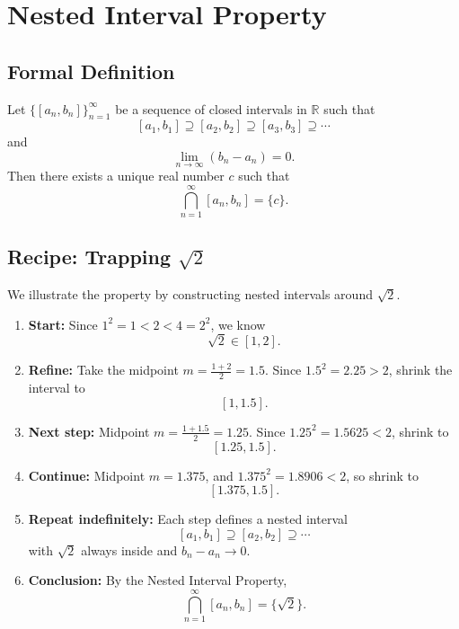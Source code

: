 \documentclass[a4paper,12pt]{article}
\begin{document}
\section*{Nested Interval Property}

\subsection*{Formal Definition}
Let $\{[a_n,b_n]\}_{n=1}^\infty$ be a sequence of closed intervals in $\mathbb{R}$ such that
\[
[a_1,b_1] \supseteq [a_2,b_2] \supseteq [a_3,b_3] \supseteq \cdots
\]
and
\[
\lim_{n \to \infty} (b_n - a_n) = 0.
\]
Then there exists a unique real number $c$ such that
\[
\bigcap_{n=1}^\infty [a_n,b_n] = \{c\}.
\]

\subsection*{Recipe: Trapping $\sqrt{2}$}
We illustrate the property by constructing nested intervals around $\sqrt{2}$.

\begin{enumerate}
	\item \textbf{Start:} Since $1^2 = 1 < 2 < 4 = 2^2$, we know
	$$
	\sqrt{2} \in [1,2].
	$$
	
	\item \textbf{Refine:} Take the midpoint $m = \tfrac{1+2}{2} = 1.5$.  
	Since $1.5^2 = 2.25 > 2$, shrink the interval to
	$$
	[1,1.5].
	$$
	
	\item \textbf{Next step:} Midpoint $m = \tfrac{1+1.5}{2} = 1.25$.  
	Since $1.25^2 = 1.5625 < 2$, shrink to
	$$
	[1.25,1.5].
	$$
	
	\item \textbf{Continue:} Midpoint $m = 1.375$, and $1.375^2 = 1.8906 < 2$, so shrink to
	$$
	[1.375,1.5].
	$$
	
	\item \textbf{Repeat indefinitely:} Each step defines a nested interval
	$$
	[a_1,b_1] \supseteq [a_2,b_2] \supseteq \cdots
	$$
	with $\sqrt{2}$ always inside and $b_n - a_n \to 0$.
	
	\item \textbf{Conclusion:} By the Nested Interval Property,
	$$
	\bigcap_{n=1}^\infty [a_n,b_n] = \{\sqrt{2}\}.
	$$
\end{enumerate}

	
\end{document}
